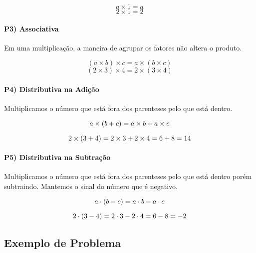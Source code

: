 \documentclass[letterpaper]{book}
\newcommand{\tikzmark}[1]{\tikz[overlay, remember picture] \node (#1){};}
\newcommand{\upcomarrow}[3]{\draw[arrow up, #3] (#1.north west) to (#2.north);}
\begin{document}
\[ a \times 1 = a \]
\[ 2 \times 1 = 2 \]

\paragraph{P3) Associativa}

Em uma multiplicação, a maneira de agrupar os fatores não altera o produto.

\[ (a \times b) \times c = a \times (b \times c) \]
\[ (2 \times 3) \times 4 = 2 \times (3 \times 4) \]

\paragraph{P4) Distributiva na Adição} 

Multiplicamos o número que está fora dos parenteses pelo que está dentro.

\[ a\tikzmark{a} \times (b\tikzmark{b} + c\tikzmark{c}) = a \times b + a \times c \]

\[ 2\tikzmark{2} \times (3\tikzmark{3} + 4\tikzmark{4}) = 2 \times 3 + 2 \times 4 = 6 + 8 = 14 \]


\paragraph{P5) Distributiva na Subtração}

Multiplicamos o número que está fora dos parenteses pelo que está dentro porém subtraindo. Mantemos o sinal do número que é negativo.

\[ a\tikzmark{a} \cdot (b\tikzmark{b} - c\tikzmark{c}) = a \cdot b - a \cdot c \]

\[ 2\tikzmark{2} \cdot (3\tikzmark{3} - 4\tikzmark{4}) = 2 \cdot 3 - 2 \cdot 4 = 6 - 8 = -2 \]


\subsection{Exemplo de Problema}
\end{document}
